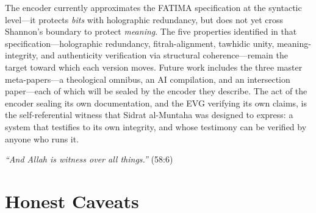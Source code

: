 \documentclass[11pt,a4paper]{article}
\begin{document}
The encoder currently approximates the FATIMA specification \cite{arfeen2026fatima} at the syntactic level---it protects \textit{bits} with holographic redundancy, but does not yet cross Shannon's boundary to protect \textit{meaning}. The five properties identified in that specification---holographic redundancy, fitrah-alignment, tawhidic unity, meaning-integrity, and authenticity verification via structural coherence---remain the target toward which each version moves. Future work includes the three master meta-papers---a theological omnibus, an AI compilation, and an intersection paper---each of which will be sealed by the encoder they describe. The act of the encoder sealing its own documentation, and the EVG verifying its own claims, is the self-referential witness that Sidrat al-Muntaha was designed to express: a system that testifies to its own integrity, and whose testimony can be verified by anyone who runs it.

\begin{center}
\textit{``And Allah is witness over all things.''} (58:6)
\end{center}

\section*{Honest Caveats}
\end{document}
